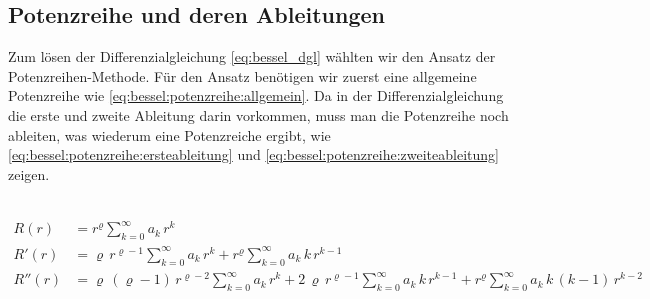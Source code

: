 \subsection*{Potenzreihe und deren Ableitungen}

\begin{normalsize}
	Zum l\"osen der Differenzialgleichung \ref{eq:bessel_dgl} w\"ahlten wir den Ansatz der Potenzreihen-Methode.
	F\"ur den Ansatz ben\"otigen wir zuerst eine allgemeine Potenzreihe wie \ref{eq:bessel:potenzreihe:allgemein}.
	Da in der Differenzialgleichung die erste und zweite Ableitung darin vorkommen,
	muss man die Potenzreihe noch ableiten, was wiederum eine Potenzreiche ergibt,
	wie \ref{eq:bessel:potenzreihe:ersteableitung} und \ref{eq:bessel:potenzreihe:zweiteableitung} zeigen.
\end{normalsize}
\\
\begin{align}
	R \left( r \right)
	&=
	r^{\varrho}
	\sum_{k=0}^{\infty} a_k \, r^k
	\label{eq:bessel:potenzreihe:allgemein}
\\
	R'\left( r \right)
	&=
	\varrho \, r^{\varrho - 1}
	\sum_{k=0}^{\infty} a_k \, r^k
	+
	r^{\varrho}
	\sum_{k=0}^{\infty} a_k \, k \, r^{k - 1}
	\label{eq:bessel:potenzreihe:ersteableitung}
\\
	R'' \left( r \right)
	&=
	\varrho \, \left( \varrho - 1 \right) \, r^{\varrho - 2}
	\sum_{k=0}^{\infty} a_k \, r^k
	+
	2 \, \varrho \, r^{\varrho - 1}
	\sum_{k=0}^{\infty} a_k \, k \, r^{k - 1}
	+
	r^{\varrho}
	\sum_{k=0}^{\infty} a_k \, k \, \left( k - 1 \right) \, r^{k - 2}	
	\label{eq:bessel:potenzreihe:zweiteableitung}
\end{align}
%	
%		

